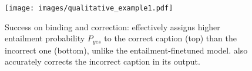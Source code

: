 \begin{figure}[t!]
\centering
\texttt{[image: images/qualitative\_example1.pdf]}
\vspace{-0.7cm}
\caption{Success on binding and correction: \method{} effectively assigns higher entailment probability $P_{yes}$ to the correct caption (top) than the incorrect one (bottom), unlike the entailment-finetuned model. \method{} also accurately corrects the incorrect caption in its output.}
\vspace{-0.45cm}
\label{fig:qualtitative_main}
\end{figure}